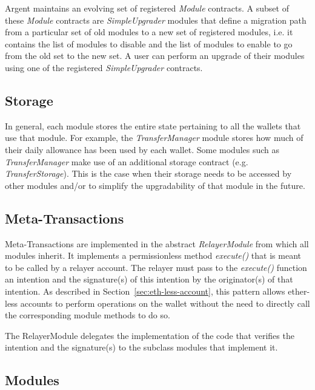 \documentclass[12pt]{article}
\begin{document}
Argent maintains an evolving set of registered \emph{Module} contracts. A subset of these \emph{Module} contracts are \emph{SimpleUpgrader} modules that define a migration path from a particular set of old modules to a new set of registered modules, i.e. it contains the list of modules to disable and the list of modules to enable to go from the old set to the new set. A user can perform an upgrade of their modules using one of the registered \emph{SimpleUpgrader} contracts.



\subsection{Storage}
\label{sec:storage}
In general, each module stores the entire state pertaining to all the wallets that use that module. For example, the \emph{TransferManager} module stores how much of their daily allowance has been used by each wallet. Some modules such as \emph{TransferManager} make use of an additional storage contract (e.g. \emph{TransferStorage}). This is the case when their storage needs to be accessed by other modules and/or to simplify the upgradability of that module in the future.

\subsection{Meta-Transactions}
\label{sec:meta-transactions}
Meta-Transactions are implemented in the abstract \emph{RelayerModule} from which all modules inherit. It implements a permissionless method \emph{execute()} that is meant to be called by a relayer account. The relayer must pass to the \emph{execute()} function an intention and the signature(s) of this intention by the originator(s) of that intention. As described in Section~\ref{sec:eth-less-account}, this pattern allows ether-less accounts to perform operations on the wallet without the need to directly call the corresponding module methods to do so.

The RelayerModule delegates the implementation of the code that verifies the intention and the signature(s) to the subclass modules that implement it.

\subsection{Modules}
\end{document}
